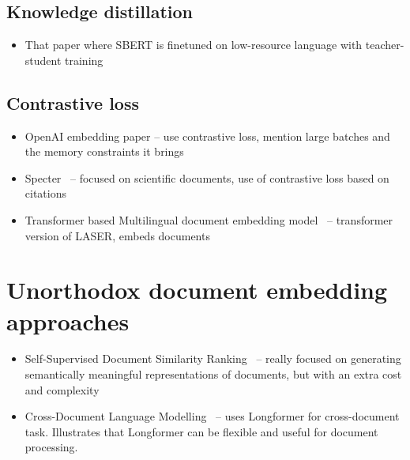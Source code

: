 \subsection{Knowledge distillation}

\begin{itemize}

      \item That paper where SBERT is finetuned on low-resource language with
          teacher-student training~\cite{reimers2020making}

\end{itemize}

\subsection{Contrastive loss}

\begin{itemize}

      \item OpenAI embedding paper -- use contrastive loss, mention large batches
        and the memory constraints it brings

      \item Specter~\cite{cohan2020specter} -- focused on scientific documents, use
        of contrastive loss based on citations

      \item Transformer based Multilingual document embedding
        model~\cite{li2020transformer} -- transformer version of LASER, embeds
        documents

\end{itemize}

\section{Unorthodox document embedding approaches}

\begin{itemize}

    \item Self-Supervised Document Similarity Ranking~\cite{ginzburg2021self} --
    really focused on generating semantically meaningful representations of
    documents, but with an extra cost and complexity


    \item Cross-Document Language Modelling~\cite{caciularu2021cdlm} -- uses
    Longformer for cross-document task. Illustrates that Longformer can be
    flexible and useful for document processing.

\end{itemize}
